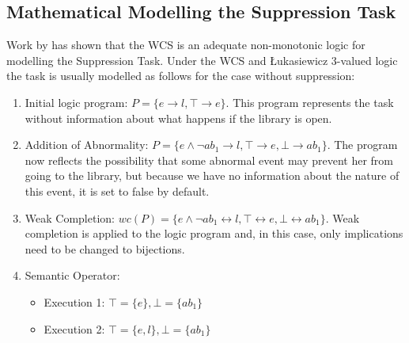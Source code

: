 \documentclass[
11pt, %
english, %
singlespacing, %
headsepline, %
]{MastersDoctoralThesis} %
\begin{document}
\subsection{Mathematical Modelling the Suppression Task} \label{ssec:sup_mod}
Work by \cite{dietz2014modeling} has shown that the WCS is an adequate non-monotonic logic for modelling the Suppression Task. Under the WCS and \L ukasiewicz 3-valued logic the task is usually modelled as follows for the case without suppression:
\begin{enumerate}
\item Initial logic program: $P = \{e \rightarrow l, \top \rightarrow e \}$. This program represents the task without information about what happens if the library is open.
\item Addition of Abnormality: $P = \{e \land \lnot ab_1 \rightarrow l, \top \rightarrow e, \bot \rightarrow ab_1 \}$. The program now reflects the possibility that some abnormal event may prevent her from going to the library, but because we have no information about the nature of this event, it is set to false by default.
\item Weak Completion: $wc(P) = \{e \land \lnot ab_1 \leftrightarrow l, \top \leftrightarrow e, \bot \leftrightarrow ab_1 \}$. Weak completion is applied to the logic program and, in this case, only implications need to be changed to bijections.
\item Semantic Operator:
\begin{itemize}
\item Execution 1: $\top=\{e\}, \bot=\{ab_1\}$
\item Execution 2: $\top=\{e,l\}, \bot=\{ab_1\}$
\end{itemize}
\end{enumerate}
\end{document}

